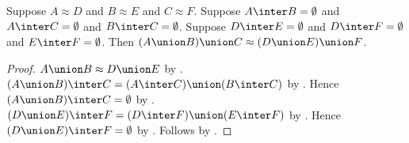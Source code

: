\begin{theorem}\label{three_disjoint_unions_equinum_congruent}
    Suppose $A\approx D$ and $B\approx E$ and $C\approx F$.
    Suppose $A\inter B=\emptyset$ and $A\inter C=\emptyset$ and
        $B\inter C=\emptyset$.
    Suppose $D\inter E=\emptyset$ and $D\inter F=\emptyset$ and
        $E\inter F=\emptyset$.
    Then $(A\union B)\union C\approx(D\union E)\union F$.
\end{theorem}
\begin{proof}
    $A\union B\approx D\union E$
        by .
    $(A\union B)\inter C
        =(A\inter C)\union(B\inter C)$
        by .
    Hence $(A\union B)\inter C=\emptyset$
        by .
    $(D\union E)\inter F
        =(D\inter F)\union(E\inter F)$
        by .
    Hence $(D\union E)\inter F=\emptyset$
        by .
    Follows by .
\end{proof}
